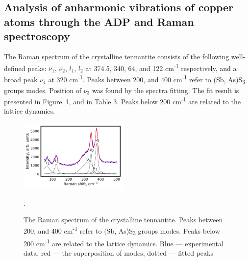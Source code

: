 \documentclass[preprint,review,12pt]{elsarticle}
\begin{document}
\subsection{Analysis of anharmonic vibrations of copper atoms through the ADP and Raman spectroscopy}\label{sec:level2}

The Raman spectrum of the crystalline tennantite consists of the following well-defined peaks: $\nu_{1}$, $\nu_{2}$, $l_{1}$, $l_{2}$ at 374.5, 340, 64, and 122 cm\textsuperscript{-1} respectively, and a broad peak $\nu_{4}$ at 320 cm\textsuperscript{-1}. Peaks between 200, and 400 cm\textsuperscript{-1} refer to (Sb, As)S\textsubscript{3} groups modes\cite{Kharbish2007}.
Position of $\nu_{3}$ was found by the spectra fitting.
The fit result is presented in Figure~\ref{fig:full_raman}, and in Table 3. Peaks below 200 cm\textsuperscript{-1} are related to the lattice dynamics\cite{Buzatu2017}.

\begin{figure}[h]
\centering
\includegraphics[width=0.48\textwidth]{raman_25_CuAsS3_eng_components}
\caption{\label{fig:full_raman} The Raman spectrum of the crystalline tennantite. Peaks between 200, and 400 cm\textsuperscript{-1} refer to (Sb, As)S\textsubscript{3} groups modes\cite{Kharbish2007}. Peaks below 200 cm\textsuperscript{-1} are related to the lattice dynamics\cite{Buzatu2017}. Blue --- experimental data, red --- the superposition of modes, dotted --- fitted peaks}.
\end{figure}
\end{document}
